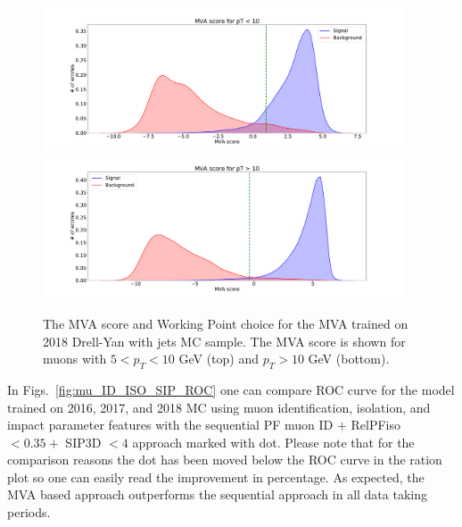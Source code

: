 \begin{figure}[!htb]
   \vspace*{0.3cm}
   \begin{center}
      \includegraphics[width=0.95\textwidth]{Figures/Muons/MVA_score_5_2018.pdf}\\
      \includegraphics[width=0.95\textwidth]{Figures/Muons/MVA_score_10_2018.pdf}
   \caption{The MVA score and Working Point choice for the MVA trained on 2018 Drell-Yan with jets MC sample. The MVA score is shown for muons with
   $5 < p_T < 10 $ GeV (top) and $p_T > 10$ GeV (bottom).}
   \label{fig:mu_MVA_score_2018}
   \end{center}
\end{figure}


In Figs.~\ref{fig:mu_ID_ISO_SIP_ROC} one can compare ROC curve for the model trained on 2016, 2017, and 2018 MC using muon identification, isolation, and impact
parameter features with the sequential PF muon ID $+$ RelPFiso $< 0.35 +$ SIP3D $< 4$ approach marked with dot. Please note that for the comparison reasons the dot has
been moved below the ROC curve in the ration plot so one can easily read the improvement in percentage. As expected, the MVA based approach outperforms the sequential
approach in all data taking periods.

